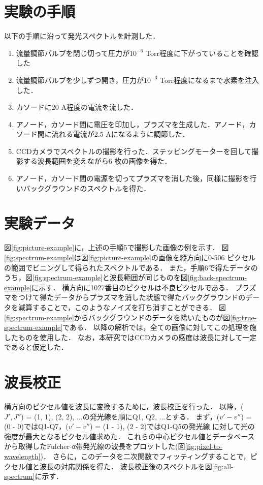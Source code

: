 \section{実験の手順}
以下の手順に沿って発光スペクトルを計測した．
\begin{enumerate}
    \item 流量調節バルブを閉じ切って圧力が$10^{-6}$ Torr程度に下がっていることを確認した
    \item 流量調節バルブを少しずつ開き，圧力が$10^{-3}$ Torr程度になるまで水素を注入した．
    \item カソードに20 A程度の電流を流した．
    \item アノード，カソード間に電圧を印加し，プラズマを生成した．アノード，カソード間に流れる電流が2.5 Aになるように調節した．
    \item CCDカメラでスペクトルの撮影を行った．ステッピングモーターを回して撮影する波長範囲を変えながら6 枚の画像を得た．
    \item アノード，カソード間の電源を切ってプラズマを消した後，同様に撮影を行いバックグラウンドのスペクトルを得た．
\end{enumerate}

\section{実験データ}
図\ref{fig:picture-example}に，上述の手順5で撮影した画像の例を示す．
図\ref{fig:spectrum-example}は図\ref{fig:picture-example}の画像を縦方向に0-506 ピクセルの範囲でビニングして得られたスペクトルである．
また，手順6で得たデータのうち，図\ref{fig:spectrum-example}と波長範囲が同じものを図\ref{fig:back-spectrum-example}に示す．
横方向に1027番目のピクセルは不良ピクセルである．
プラズマをつけて得たデータからプラズマを消した状態で得たバックグラウンドのデータを減算することで，このようなノイズを打ち消すことができる．
図\ref{fig:spectrum-example}からバックグラウンドのデータを除いたものが図\ref{fig:true-spectrum-example}である．
以降の解析では，全ての画像に対してこの処理を施したものを使用した．
なお，本研究ではCCDカメラの感度は波長に対して一定であると仮定した．

\section{波長校正}
横方向のピクセル値を波長に変換するために，波長校正を行った．
以降，($J', J''$) = (1, 1), (2, 2), ...の発光線を順にQ1, Q2, ...とする．
まず，($v'-v''$) = (0 - 0)ではQ1-Q7，($v'-v''$) = (1 - 1), (2 - 2)ではQ1-Q5の発光線
に対して光の強度が最大となるピクセル値求めた．
これらの中心ピクセル値とデータベース\cite{H2-spectrum-data}から取得したFulcher-α帯発光線の波長をプロットした(図\ref{fig:pixel-to-wavelength})．
さらに，このデータを二次関数でフィッティングすることで，ピクセル値と波長の対応関係を得た．
波長校正後のスペクトルを図\ref{fig:all-spectrum}に示す．
